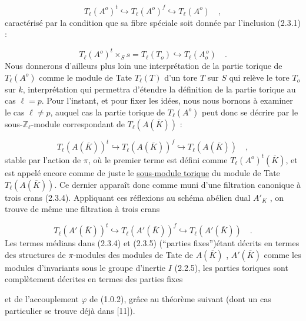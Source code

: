 \begin{equation}\tag{2.3.2}
T_\ell(A^o)^t \hookrightarrow T_\ell(A^o)^f \hookrightarrow T_\ell(A^o) \quad ,
\end{equation}
caractérisé par la condition que sa fibre spéciale soit donnée par l'inclusion (2.3.1) :

\begin{equation}\tag{2.3.3}
T_\ell(A^o)^t \times_S s = T_\ell(T_o) \hookrightarrow T_\ell(A_o^{\,o}) \quad .
\end{equation}
Nous donnerons d'ailleurs plus loin une interprétation de la partie torique de $T_\ell(A^o)$ comme le module de Tate $T_\ell(T)$ d'un tore $T$ sur $S$ qui relève le tore $T_o$ sur $k$, interprétation qui permettra d'étendre la définition de la partie torique au cas $\ell = p$. Pour l'instant, et pour fixer les idées, nous nous bornons à examiner le cas $\ell \neq p$, auquel cas la partie torique de $T_\ell(A^o)$ peut donc se décrire par le sous-$\mathbb{Z}_\ell$-module correspondant de $T_\ell(A(\overline{K}))$ :

\begin{equation}\tag{2.3.4}
T_\ell(A(\overline{K}))^t \hookrightarrow T_\ell(A(\overline{K}))^f \hookrightarrow T_\ell(A(\overline{K})) \quad ,
\end{equation}
stable par l'action de $\pi$, où le premier terme est défini comme $T_\ell(A^o)^t(\overline{K})$, et est appelé encore comme de juste le \underline{sous-module torique} du module de Tate $T_\ell(A(\overline{K}))$. Ce dernier apparaît donc comme muni d'une filtration canonique à trois crans (2.3.4). Appliquant ces réflexions au schéma abélien dual $A'_K$ , on trouve de même une filtration à trois crans

\begin{equation}\tag{2.3.5}
T_\ell(A'(\overline{K}))^t \hookrightarrow T_\ell(A'(\overline{K}))^f \hookrightarrow T_\ell(A'(\overline{K})) \quad .
\end{equation}
Les termes médians dans (2.3.4) et (2.3.5) (``parties fixes'')étant décrits en termes des structures de $\pi$-modules des modules de Tate de $A(\overline{K})$ , $A'(\overline{K})$ comme les modules d'invariants sous le groupe d'inertie $I$ (2.2.5), les parties toriques sont complètement décrites en termes des parties fixes



et de l'accouplement $\varphi$ de (1.0.2), grâce au théorème suivant (dont un cas particulier se trouve déjà dans [11]).

